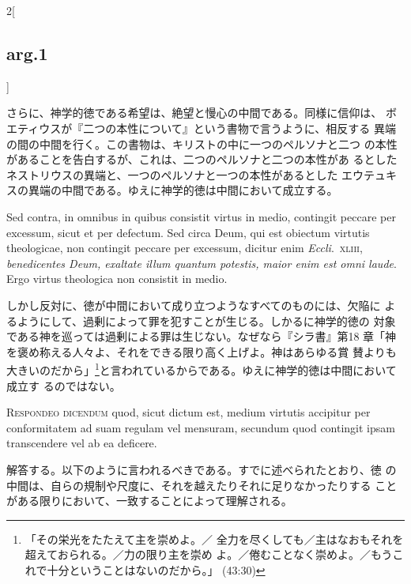 \documentclass[paper=a4paper,fontsize=10pt,jafontsize=9pt,titlepage]{jlreq}
\begin{document}
\begin{paracol}{2}[\subsection{arg.1}]
\switchcolumn

さらに、神学的徳である希望は、絶望と慢心の中間である。同様に信仰は、
 ボエティウスが『二つの本性について』という書物で言うように、相反する
 異端の間の中間を行く。この書物は、キリストの中に一つのペルソナと二つ
 の本性があることを告白するが、これは、二つのペルソナと二つの本性があ
 るとしたネストリウスの異端と、一つのペルソナと一つの本性があるとした
 エウテュキスの異端の中間である。ゆえに神学的徳は中間において成立する。

\switchcolumn*[\subsection{s.c.}]

Sed contra, in omnibus in quibus consistit virtus in medio, contingit
 peccare per excessum, sicut et per defectum. Sed circa Deum, qui est
 obiectum virtutis theologicae, non contingit peccare per excessum,
 dicitur enim {\itshape Eccli}.~{\scshape xliii}, {\itshape
 benedicentes Deum, exaltate illum quantum potestis, maior enim est
 omni laude}. Ergo virtus theologica non consistit in medio.

\switchcolumn

しかし反対に、徳が中間において成り立つようなすべてのものには、欠陥に
 よるようにして、過剰によって罪を犯すことが生じる。しかるに神学的徳の
 対象である神を巡っては過剰による罪は生じない。なぜなら『シラ書』第18
 章「神を褒め称える人々よ、それをできる限り高く上げよ。神はあらゆる賞
 賛よりも大きいのだから」\footnote{「その栄光をたたえて主を崇めよ。／
 全力を尽くしても／主はなおもそれを超えておられる。／力の限り主を崇め
 よ。／倦むことなく崇めよ。／もうこれで十分ということはないのだから。」
 (43:30)}と言われているからである。ゆえに神学的徳は中間において成立す
 るのではない。


{\scshape Respondeo dicendum} quod, sicut dictum est, medium virtutis
 accipitur per conformitatem ad suam regulam vel mensuram, secundum
 quod contingit ipsam transcendere vel ab ea deficere.

\switchcolumn

解答する。以下のように言われるべきである。すでに述べられたとおり、徳
 の中間は、自らの規制や尺度に、それを越えたりそれに足りなかったりする
 ことがある限りにおいて、一致することによって理解される。


\end{paracol}
\end{document}

